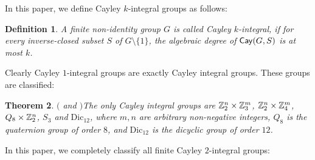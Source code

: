 \documentclass{amsart}
\newtheorem{thm}{Theorem}[section]
\newtheorem{defi}[thm]{Definition}
\def\Cay{{\sf Cay}} \def\Ker{{\sf Ker}}
\begin{document}
In this paper, we define Cayley \( k \)-integral groups as follows:
\begin{defi}
	A finite non-identity group $G$ is called \textrm{Cayley $k$-integral}, if for every inverse-closed subset $S$ of $G\setminus\{1\}$, the algebraic degree of $\Cay(G,S)$ is at most $k$.
\end{defi}

Clearly Cayley $1$-integral groups are exactly Cayley integral groups. These groups are classified:
\begin{thm}$($\cite[Theorem 1.2]{AJ} and \cite[Theorem 4.2]{Azhvan}$)$\label{azhv}
	The only Cayley integral groups are $\Bbb Z_2^n\times\Bbb Z_3^m$, $\Bbb Z_2^n\times\Bbb Z_4^m$, $Q_8\times\Bbb Z_2^n$, $S_3$ and $\textrm{Dic}_{12}$, where $m,n$ are arbitrary non-negative integers, $Q_8$ is the quaternion group of order $8$, and $\textrm{Dic}_{12}$ is the dicyclic group of order $12$.
\end{thm}
In this paper, we completely classify all finite Cayley $2$-integral groups:
\end{document}
